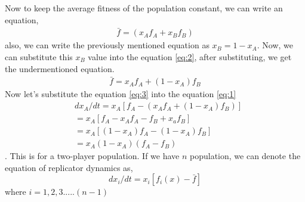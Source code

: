 \documentclass{article}
\begin{document}
Now to keep the average fitness of the population constant, we can write an equation,
\begin{align}
\bar{f}= (x_Af_A+x_Bf_B)\label{eq:2}
\end{align} 
also, we can write the previously mentioned equation as $x_B=1-x_A$.
Now, we can substitute this $x_B$ value into the equation \ref{eq:2}, after substituting, we get the undermentioned equation.
\begin{align}
\bar{f}={x_Af_A+ (1-x_A)f_B}\label{eq:3}
\end{align}
Now let's substitute the equation \ref{eq:3} into the equation \ref{eq:1}
\begin{align}
&dx_A/dt=x_A[f_A-(x_Af_A+(1-x_A)f_B)] \nonumber\\
          &=x_A[f_A-x_Af_A-f_B+x_af_B] \nonumber\\
          &=x_A[(1-x_A)f_A-(1-x_A)f_B] \nonumber\\
          &=x_A(1-x_A)(f_A-f_B) \nonumber
\end{align} .
This is for a two-player population. If we have $n$ population, we can denote the equation of replicator dynamics as,
\[dx_i/dt=x_i[f_i(x)-\bar{f}]\]
where $i=1,2,3.....(n-1)$
\end{document}
